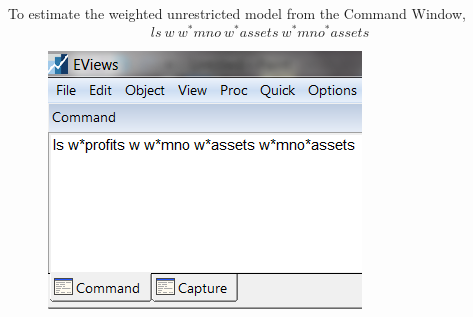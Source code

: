 \documentclass[12pt]{report}
\begin{document}
\noindent To estimate the weighted unrestricted model from the Command Window,
$$ls\ w\ w^*mno\ w^*assets\ w^*mno^*assets$$
\begin{figure}[H]
	\centering
	\includegraphics{tute9_11}
\end{figure}
\vspace{-\baselineskip}
\end{document}
